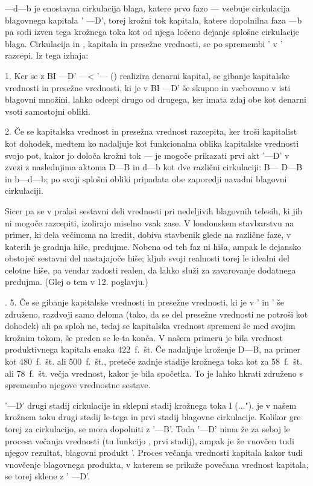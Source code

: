 \documentclass[kapital_02.tex]{subfiles}
\begin{document}
\KPEb —d—b je enostavna cirkulacija blaga, katere prvo fazo \KPEb — \KPEd vsebuje cirkulacija blagovnega kapitala \KPEB' —D', torej krožni tok kapitala, katere dopolnilna faza \KPEd —b pa sodi izven tega krožnega toka kot od njega ločeno dejanje splošne cirkulacije blaga. Cirkulacija \KPEB in \KPEb, kapitala in presežne vrednosti, se po spremembi \KPEB' v \KPED' razcepi. Iz tega izhaja:

1. Ker se z BI —D' —< \KPEB'— (\KPED \KPEd) realizira denarni kapital, se gibanje kapitalske vrednosti in presežne vrednosti, ki je v BI —D' še skupno in vsebovano v isti blagovni množini, lahko odcepi drugo od drugega, ker imata zdaj obe kot denarni vsoti samostojni obliki.

2. Če se kapitalska vrednost in presežna vrednost razcepita, ker troši kapitalist \KPEd kot dohodek, medtem ko nadaljuje \KPED kot funkcionalna oblika kapitalske vrednosti svojo pot, kakor jo določa krožni tok — je mogoče prikazati prvi akt \KPEB'—D' v zvezi z naslednjima aktoma D—B in d—b kot dve različni cirkulaciji: B— D—B in b—d—b; po svoji splošni obliki pripadata obe zaporedji navadni blagovni cirkulaciji.

Sicer pa se v praksi sestavni deli vrednosti pri nedeljivih blagovnih telesih, ki jih ni mogoče razcepiti, izolirajo miselno vsak zase. V londonskem stavbarstvu na primer, ki dela večinoma na kredit, dobiva stavbenik glede na različne faze, v katerih je gradnja hiše, predujme. Nobena od teh faz ni hiša, ampak le dejansko obstoječ sestavni del nastajajoče hiše; kljub svoji realnosti torej le idealni del celotne hiše, pa vendar zadosti realen, da lahko služi za zavarovanje dodatnega predujma. (Glej o tem v 12. poglavju.)

. 5. Če se gibanje kapitalske vrednosti in presežne vrednosti, ki je v \KPEB' in \KPED' še združeno, razdvoji samo deloma (tako, da se del presežne vrednosti ne potroši kot dohodek) ali pa sploh ne, tedaj se kapitalska vrednost spremeni še med svojim krožnim tokom, še preden se le-ta konča. V našem primeru je bila vrednost produktivnega kapitala enaka 422~f.~št. Če nadaljuje kroženje D—B, na primer kot 480~f.~št. ali 500~f.~št., preteče zadnje stadije krožnega toka kot za 58~f.~št. ali 78~f.~št. večja vrednost, kakor je bila spočetka. To je lahko hkrati združeno s spremembo njegove vrednostne sestave.

\KPEB'—D' drugi stadij cirkulacije in sklepni stadij krožnega toka I (\KPED...\KPED"), je v našem krožnem toku drugi stadij le-tega in prvi stadij blagovne cirkulacije. Kolikor gre torej za cirkulacijo, se mora dopolniti z \KPED'—B'. Toda \KPEB'—D' nima že za seboj le procesa večanja vrednosti (tu funkcijo \KPEP, prvi stadij), ampak je že vnovčen tudi njegov rezultat, blagovni produkt \KPEB'. Proces večanja vrednosti kapitala kakor tudi vnovčenje blagovnega produkta, v katerem se prikaže povečana vrednost kapitala, se torej sklene z \KPEB' —D'.
\end{document}

